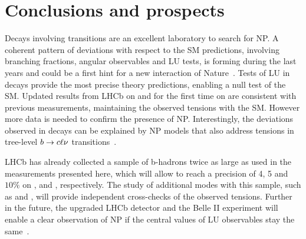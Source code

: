 \documentclass[a4paper,11pt]{article}
\begin{document}
\section{Conclusions and prospects}
Decays involving \bsll transitions are an excellent laboratory to search for NP. 
A coherent pattern of deviations with respect to the SM predictions, involving branching fractions, angular observables and LU tests, is forming during the last years and could be a first hint for a new interaction of Nature~\cite{patterns-LQ}.
Tests of LU in \bsll decays provide the most precise theory predictions, enabling a null test of the SM. 
Updated results from LHCb on \RK and for the first time on \RpK are consistent with previous measurements, maintaining the observed tensions with the SM. However more data is needed to confirm the presence of NP. 
Interestingly, the deviations observed in \bsll decays can be explained by NP models that also address tensions in tree-level ${{b}}\to{\ensuremath{{c}}}\ell\nu$ transitions~\cite{patterns-LQ}.

LHCb has already collected a sample of b-hadrons twice as large as used in the measurements presented here, which will allow to reach a precision of 4, 5 and $10\%$ on \RK, \RKst and \RpK, respectively. 
The study of additional modes with this sample, such as \BsToPhill and \BuToPill, will provide independent cross-checks of the observed tensions.
Further in the future, the upgraded LHCb detector and the Belle II experiment will enable a clear observation of NP if the central values of LU observables stay the same~\cite{LHCb-U2-Belle2}.
\end{document}
